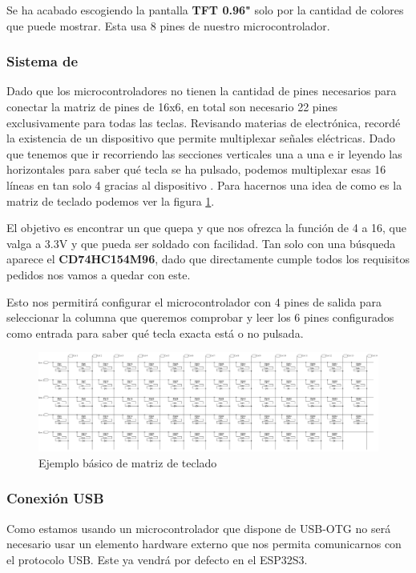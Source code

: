 Se ha acabado escogiendo la pantalla \textbf{\gls{TFT} 0.96"} solo por la cantidad de colores que puede mostrar. Esta usa 8 pines de nuestro microcontrolador.

\subsubsection{Sistema de }
Dado que los microcontroladores no tienen la cantidad de pines necesarios para conectar la matriz de pines de 16x6, en total son necesario 22 pines exclusivamente para todas las teclas. Revisando materias de electrónica, recordé la existencia de un dispositivo que permite multiplexar señales eléctricas. Dado que tenemos que ir recorriendo las secciones verticales una a una e ir leyendo las horizontales para saber qué tecla se ha pulsado, podemos multiplexar esas 16 líneas en tan solo 4 gracias al dispositivo . Para hacernos una idea de como es la matriz de teclado podemos ver la figura \ref{fig:EjemploArrayTeclado}.

El objetivo es encontrar un  que quepa y que nos ofrezca la función de 4 a 16, que valga a 3.3V y que pueda ser soldado con facilidad. Tan solo con una búsqueda aparece el \textbf{CD74HC154M96}, dado que directamente cumple todos los requisitos pedidos nos vamos a quedar con este.

Esto nos permitirá configurar el microcontrolador con 4 pines de salida para seleccionar la columna que queremos comprobar y leer los 6 pines configurados como entrada para saber qué tecla exacta está o no pulsada.

\begin{figure}[H]
    \centering
    \includegraphics[width=1\textwidth]{imagenes/Capitulos/Cap03/EjemploArrayTeclado.png}
    \caption{Ejemplo básico de matriz de teclado \cite{EjemploArrayTeclado}}
    \label{fig:EjemploArrayTeclado}
\end{figure}

\newpage
\subsubsection{Conexión \gls{USB}} \label{DiseñoConexiones}
Como estamos usando un microcontrolador que dispone de \gls{USB}-OTG no será necesario usar un elemento hardware externo que nos permita comunicarnos con el protocolo \gls{USB}. Este ya vendrá por defecto en el ESP32S3.

